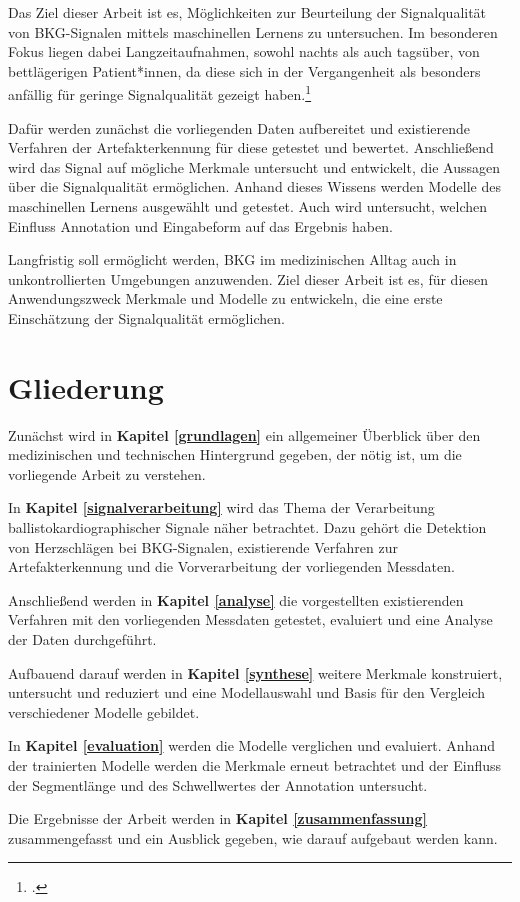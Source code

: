 Das Ziel dieser Arbeit ist es, Möglichkeiten zur Beurteilung der Signalqualität von \ac{BKG}-Signalen mittels maschinellen Lernens zu untersuchen. Im besonderen Fokus liegen dabei Langzeitaufnahmen, sowohl nachts als auch tagsüber, von bettlägerigen Patient*innen, da diese sich in der Vergangenheit als besonders anfällig für geringe Signalqualität gezeigt haben.\footcite{HoogAntink2020}

Dafür werden zunächst die vorliegenden Daten aufbereitet und existierende Verfahren der Artefakterkennung für diese getestet und bewertet. Anschließend wird das Signal auf mögliche Merkmale untersucht und entwickelt, die Aussagen über die Signalqualität ermöglichen. Anhand dieses Wissens werden Modelle des maschinellen Lernens ausgewählt und getestet. Auch wird untersucht, welchen Einfluss Annotation und Eingabeform auf das Ergebnis haben.

Langfristig soll ermöglicht werden, \acf{BKG} im medizinischen Alltag auch in unkontrollierten Umgebungen anzuwenden. Ziel dieser Arbeit ist es, für diesen Anwendungszweck Merkmale und Modelle zu entwickeln, die eine erste Einschätzung der Signalqualität ermöglichen.

\section{Gliederung}

Zunächst wird in \textbf{Kapitel \ref{grundlagen}} ein allgemeiner Überblick über den medizinischen und technischen Hintergrund gegeben, der nötig ist, um die vorliegende Arbeit zu verstehen.

In \textbf{Kapitel \ref{signalverarbeitung}} wird das Thema der Verarbeitung ballistokardiographischer Signale näher betrachtet. Dazu gehört die Detektion von Herzschlägen bei \ac{BKG}-Signalen, existierende Verfahren zur Artefakterkennung und die Vorverarbeitung der vorliegenden Messdaten.

Anschließend werden in \textbf{Kapitel \ref{analyse}} die vorgestellten existierenden Verfahren mit den vorliegenden Messdaten getestet, evaluiert und eine Analyse der Daten durchgeführt.

Aufbauend darauf werden in \textbf{Kapitel \ref{synthese}} weitere Merkmale konstruiert, untersucht und reduziert und eine Modellauswahl und Basis für den Vergleich verschiedener Modelle gebildet. %

In \textbf{Kapitel \ref{evaluation}} werden die Modelle verglichen und evaluiert. Anhand der trainierten Modelle werden die Merkmale erneut betrachtet und der Einfluss der Segmentlänge und des Schwellwertes der Annotation untersucht.

Die Ergebnisse der Arbeit werden in \textbf{Kapitel \ref{zusammenfassung}} zusammengefasst und ein Ausblick gegeben, wie darauf aufgebaut werden kann.